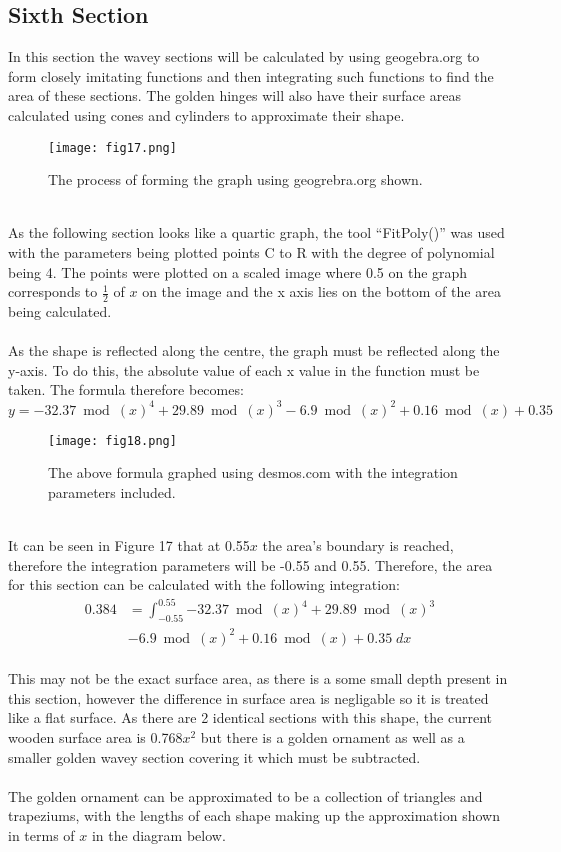 \documentclass[a4paper,12pt]{article}
\begin{document}
\subsection{Sixth Section}
In this section the wavey sections will be calculated by using geogebra.org to form closely imitating functions and then integrating such functions to find the area of these sections. The golden hinges will also have their surface areas calculated using cones and cylinders to approximate their shape.\\
\begin{figure}[h!]
\centering
\texttt{[image: fig17.png]}
\caption{The process of forming the graph using geogrebra.org shown.}
\label{fig:clock17}
\end{figure}\\As the following section looks like a quartic graph, the tool ``FitPoly()'' was used with the parameters being plotted points C to R with the degree of polynomial being 4. The points were plotted on a scaled image where 0.5 on the graph corresponds to $\frac{1}{2}$ of $x$ on the image and the x axis lies on the bottom of the area being calculated.\\\\As the shape is reflected along the centre, the graph must be reflected along the y-axis. To do this, the absolute value of each x value in the function must be taken. The formula therefore becomes:
$$y=-32.37\bmod(x)^4+29.89\bmod(x)^3-6.9\bmod(x)^2+0.16\bmod(x)+0.35$$
\begin{figure}[h!]
\centering
\texttt{[image: fig18.png]}
\caption{The above formula  graphed using desmos.com with the integration parameters included.}
\label{fig:clock18}
\end{figure}
\\It can be seen in Figure 17 that at 0.55$x$ the area's boundary is reached, therefore the integration parameters will be -0.55 and 0.55. Therefore, the area for this section can be calculated with the following integration:
\begin{equation}
\begin{aligned} 
0.384&=\int_{-0.55}^{0.55}{-32.37\bmod(x)^4+29.89\bmod(x)^3}\\&-6.9\bmod(x)^2+0.16\bmod(x)+0.35\;dx
\end{aligned}
\end{equation}
\\This may not be the exact surface area, as there is a some small depth present in this section, however the difference in surface area is negligable so it is treated like a flat surface. As there are 2 identical sections with this shape, the current wooden surface area is 0.768$x^2$ but there is a golden ornament as well as a smaller golden wavey section covering it which must be subtracted. \\\\The golden ornament can be approximated to be a collection of triangles and trapeziums, with the lengths of each shape making up the approximation shown in terms of $x$ in the diagram below.
\end{document}
